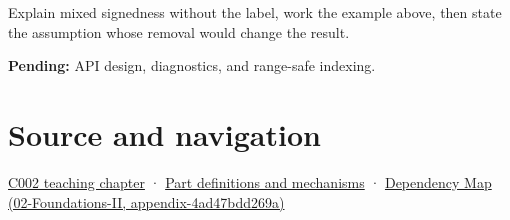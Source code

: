 Explain mixed signedness without the label, work the example above, then state the assumption whose removal would change the result.

\textbf{Pending:} API design, diagnostics, and range-safe indexing.

\section{Source and navigation}\label{appendix-736a2345de4a-source-and-navigation}

\href{Continuous\%20Notes/Computing\%20Foundations\%20-\%20From\%20Bits\%20to\%20C++\%20and\%20Systems\%20APIs\#Arithmetic\%20becomes\%20a\%20policy}{C002 teaching chapter} · \hyperref[appendix-fd090d982a15]{Part definitions and mechanisms} · \href{../02-Foundations-II/main.pdf\#nameddest=appendix-4ad47bdd269a}{Dependency Map (02-Foundations-II, appendix-4ad47bdd269a)}
